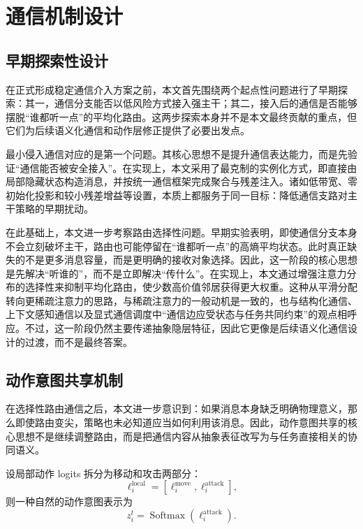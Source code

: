 \chapter{通信机制设计}

\section{早期探索性设计}

在正式形成稳定通信介入方案之前，本文首先围绕两个起点性问题进行了早期探索：其一，通信分支能否以低风险方式接入强主干；其二，接入后的通信是否能够摆脱“谁都听一点”的平均化路由。这两步探索本身并不是本文最终贡献的重点，但它们为后续语义化通信和动作层修正提供了必要出发点。

最小侵入通信对应的是第一个问题。其核心思想不是提升通信表达能力，而是先验证“通信能否被安全接入”。在实现上，本文采用了最克制的实例化方式，即直接由局部隐藏状态构造消息，并按统一通信框架完成聚合与残差注入。诸如低带宽、零初始化投影和较小残差增益等设置，本质上都服务于同一目标：降低通信支路对主干策略的早期扰动。

在此基础上，本文进一步考察路由选择性问题。早期实验表明，即使通信分支本身不会立刻破坏主干，路由也可能停留在“谁都听一点”的高熵平均状态。此时真正缺失的不是更多消息容量，而是更明确的接收对象选择。因此，这一阶段的核心思想是先解决“听谁的”，而不是立即解决“传什么”。在实现上，本文通过增强注意力分布的选择性来抑制平均化路由，使少数高价值邻居获得更大权重。这种从平滑分配转向更稀疏注意力的思路，与稀疏注意力的一般动机是一致的\cite{10.5555/3045390.3045561}，也与结构化通信、上下文感知通信以及显式通信调度中“通信边应受状态与任务共同约束”的观点相呼应\cite{sheng2023lsc,li2024cacom,kim2019schednet}。不过，这一阶段仍然主要传递抽象隐层特征，因此它更像是后续语义化通信设计的过渡，而不是最终答案。

\section{动作意图共享机制}

在选择性路由通信之后，本文进一步意识到：如果消息本身缺乏明确物理意义，那么即使路由变尖，策略也未必知道应当如何利用该消息。因此，动作意图共享的核心思想不是继续调整路由，而是把通信内容从抽象表征改写为与任务直接相关的协同语义。

设局部动作 logits 拆分为移动和攻击两部分：
\begin{equation}
\ell_i^{\text{local}} =
\left[
\ell_i^{\text{move}},
\ell_i^{\text{attack}}
\right],
\end{equation}
则一种自然的动作意图表示为
\begin{equation}
z_i^t = \operatorname{Softmax}\!\left(\ell_i^{\text{attack}}\right).
\end{equation}

